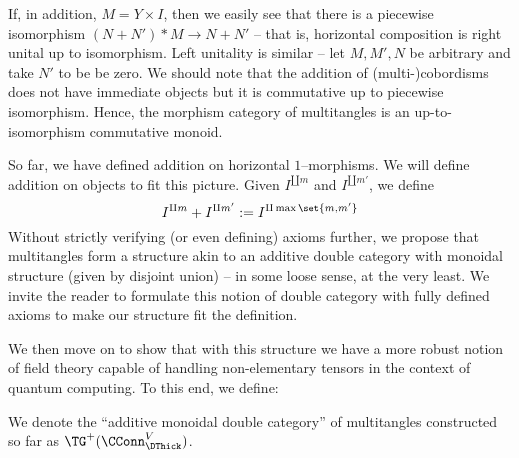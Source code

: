 If, in addition, $M = Y \times I$, then we easily see that there is a piecewise
isomorphism $(N + N') * M \to N + N'$ -- that is, horizontal composition is
right unital up to isomorphism. Left unitality is similar -- let $M, M', N$ be
arbitrary and take $N'$ to be be zero. We should note that the addition of
(multi-)cobordisms does not have immediate objects but it is commutative up to
piecewise isomorphism. Hence, the morphism category of multitangles is an
up-to-isomorphism commutative monoid.

So far, we have defined addition on horizontal $1$--morphisms. We will define
addition on objects to fit this picture. Given $I^{\amalg m}$ and
$I^{\amalg m'}$, we define
\[
  I^{\amalg m} + I^{\amalg m'} := I^{\amalg \max\set{m, m'}}
\]
Without strictly verifying (or even defining) axioms further, we propose that
multitangles form a structure akin to an additive double category with
monoidal structure (given by disjoint union) -- in some loose sense, at the very
least. We invite the reader to formulate this notion of double category with
fully defined axioms to make our structure fit the definition.

We then move on to show that with this structure we have a more robust notion of
field theory capable of handling non-elementary tensors in the context of
quantum computing. To this end, we define:

\begin{defn}
We denote the ``additive monoidal double category'' of multitangles constructed
so far as $\TG^+(\CConn^V_{\DThick})$.
\end{defn}

